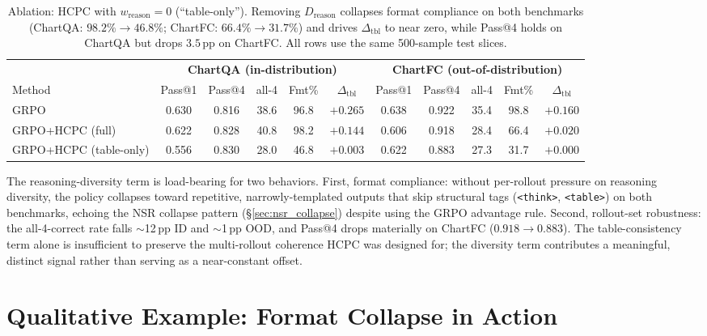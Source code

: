 \documentclass[11pt]{article}
\begin{document}
\begin{table}[!htbp]
\centering
\small
\setlength{\tabcolsep}{6pt}
\begin{tabular}{lccccc|ccccc}
\toprule
& \multicolumn{5}{c}{\textbf{ChartQA (in-distribution)}}
& \multicolumn{5}{c}{\textbf{ChartFC (out-of-distribution)}}\\
\cmidrule(lr){2-6}\cmidrule(lr){7-11}
Method & Pass@1 & Pass@4 & all-4 & Fmt\% & $\Delta_{\text{tbl}}$ &
         Pass@1 & Pass@4 & all-4 & Fmt\% & $\Delta_{\text{tbl}}$\\
\midrule
\textsc{GRPO}                   & 0.630 & 0.816 & 38.6 & 96.8 & $+0.265$ &
                                  0.638 & 0.922 & 35.4 & 98.8 & $+0.160$\\
\textsc{GRPO+HCPC} (full)       & 0.622 & 0.828 & 40.8 & 98.2 & $+0.144$ &
                                  0.606 & 0.918 & 28.4 & 66.4 & $+0.020$\\
\textsc{GRPO+HCPC} (table-only) & 0.556 & 0.830 & 28.0 & 46.8 & $+0.003$ &
                                  0.622 & 0.883 & 27.3 & 31.7 & $+0.000$\\
\bottomrule
\end{tabular}
\caption{Ablation: HCPC with $w_{\text{reason}}{=}0$
(``table-only''). Removing $D_{\text{reason}}$ collapses format
compliance on both benchmarks (ChartQA: $98.2\%\!\to\!46.8\%$;
ChartFC: $66.4\%\!\to\!31.7\%$) and drives $\Delta_{\text{tbl}}$ to
near zero, while Pass@4 holds on ChartQA but drops $3.5$\,pp on
ChartFC. All rows use the same 500-sample test slices.}
\label{tab:ablation_dreason}
\end{table}

The reasoning-diversity term is load-bearing for two behaviors.
First, format compliance: without per-rollout pressure on
reasoning diversity, the policy collapses toward repetitive,
narrowly-templated outputs that skip structural tags
(\texttt{<think>}, \texttt{<table>}) on both benchmarks, echoing
the NSR collapse pattern (\S\ref{sec:nsr_collapse}) despite using
the GRPO advantage rule. Second, rollout-set robustness: the
all-4-correct rate falls $\sim$12\,pp ID and $\sim$1\,pp OOD, and
Pass@4 drops materially on ChartFC ($0.918\!\to\!0.883$). The
table-consistency term alone is insufficient to preserve the
multi-rollout coherence HCPC was designed for; the diversity term
contributes a meaningful, distinct signal rather than serving as a
near-constant offset.

\section{Qualitative Example: Format Collapse in Action}
\label{sec:qualitative}
\end{document}
